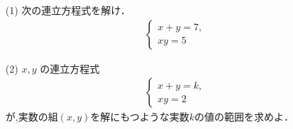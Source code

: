 \documentclass[8pt,dvipdfmx]{article}
\begin{document}
\begin{tcolorbox}[title=数学\textcircled{1} 3-2 A]
\begin{enumerate}
\item[(1)]次の連立方程式を解け．
\begin{align*}
\begin{cases}
x+y=7 ,\\
xy=5
\end{cases}
\end{align*}
\vspace{2mm} %

\item[(2)]\(x, y\) の連立方程式
\begin{align*}
\begin{cases}
x+y=k ,\\
xy=2
\end{cases}
\end{align*}
が,実数の組\((x,y)\)を解にもつような実数$k$の値の範囲を求めよ．
\end{enumerate}
\end{tcolorbox}



\end{document}
